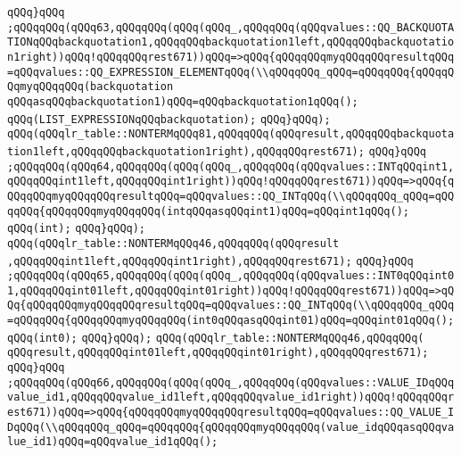 \verb|qQQq}qQQq|\newline
\verb|;qQQqqQQq(qQQq63,qQQqqQQq(qQQq(qQQq_,qQQqqQQq(qQQqvalues::QQ_BACKQUOTATIONqQQqbackquotation1,qQQqqQQqbackquotation1left,qQQqqQQqbackquotation1right))qQQq!qQQqqQQqrest671))qQQq=>qQQq{qQQqqQQqmyqQQqqQQqresultqQQq=qQQqvalues::QQ_EXPRESSION_ELEMENTqQQq(\\qQQqqQQq_qQQq=qQQqqQQq{qQQqqQQqmyqQQqqQQq(backquotation|\newline
\verb|qQQqasqQQqbackquotation1)qQQq=qQQqbackquotation1qQQq();|\newline
\verb|qQQq(LIST_EXPRESSIONqQQqbackquotation);|\newline
\verb|qQQq}qQQq);|\newline
\verb|qQQq(qQQqlr_table::NONTERMqQQq81,qQQqqQQq(qQQqresult,qQQqqQQqbackquotation1left,qQQqqQQqbackquotation1right),qQQqqQQqrest671);|\newline
\verb|qQQq}qQQq|\newline
\verb|;qQQqqQQq(qQQq64,qQQqqQQq(qQQq(qQQq_,qQQqqQQq(qQQqvalues::INTqQQqint1,qQQqqQQqint1left,qQQqqQQqint1right))qQQq!qQQqqQQqrest671))qQQq=>qQQq{qQQqqQQqmyqQQqqQQqresultqQQq=qQQqvalues::QQ_INTqQQq(\\qQQqqQQq_qQQq=qQQqqQQq{qQQqqQQqmyqQQqqQQq(intqQQqasqQQqint1)qQQq=qQQqint1qQQq();|\newline
\verb|qQQq(int);|\newline
\verb|qQQq}qQQq);|\newline
\verb|qQQq(qQQqlr_table::NONTERMqQQq46,qQQqqQQq(qQQqresult|\newline
\verb|,qQQqqQQqint1left,qQQqqQQqint1right),qQQqqQQqrest671);|\newline
\verb|qQQq}qQQq|\newline
\verb|;qQQqqQQq(qQQq65,qQQqqQQq(qQQq(qQQq_,qQQqqQQq(qQQqvalues::INT0qQQqint01,qQQqqQQqint01left,qQQqqQQqint01right))qQQq!qQQqqQQqrest671))qQQq=>qQQq{qQQqqQQqmyqQQqqQQqresultqQQq=qQQqvalues::QQ_INTqQQq(\\qQQqqQQq_qQQq=qQQqqQQq{qQQqqQQqmyqQQqqQQq(int0qQQqasqQQqint01)qQQq=qQQqint01qQQq();|\newline
\verb|qQQq(int0);|\newline
\verb|qQQq}qQQq);|\newline
\verb|qQQq(qQQqlr_table::NONTERMqQQq46,qQQqqQQq(|\newline
\verb|qQQqresult,qQQqqQQqint01left,qQQqqQQqint01right),qQQqqQQqrest671);|\newline
\verb|qQQq}qQQq|\newline
\verb|;qQQqqQQq(qQQq66,qQQqqQQq(qQQq(qQQq_,qQQqqQQq(qQQqvalues::VALUE_IDqQQqvalue_id1,qQQqqQQqvalue_id1left,qQQqqQQqvalue_id1right))qQQq!qQQqqQQqrest671))qQQq=>qQQq{qQQqqQQqmyqQQqqQQqresultqQQq=qQQqvalues::QQ_VALUE_IDqQQq(\\qQQqqQQq_qQQq=qQQqqQQq{qQQqqQQqmyqQQqqQQq(value_idqQQqasqQQqvalue_id1)qQQq=qQQqvalue_id1qQQq();|\newline
